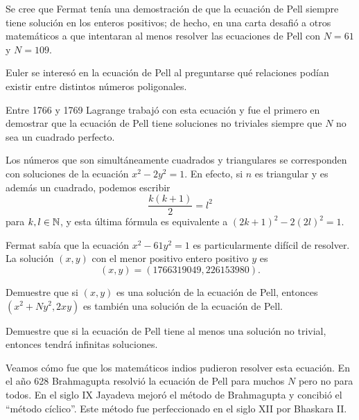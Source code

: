 Se cree que Fermat tenía una demostración de que la ecuación de Pell siempre
tiene solución en los enteros positivos; de hecho, en una carta desafió a otros
matemáticos a que intentaran al menos resolver las ecuaciones de Pell con
$N=61$ y $N=109$.  

Euler se interesó en la ecuación de Pell al preguntarse qué
relaciones podían existir entre distintos números poligonales.  

Entre 1766 y
1769 Lagrange trabajó con esta ecuación y fue el primero en demostrar que la
ecuación de Pell tiene soluciones no triviales siempre que $N$ no sea un
cuadrado perfecto. 

\begin{example}
	Los números que son simultáneamente cuadrados y triangulares se
	corresponden con soluciones de la ecuación $x^2-2y^2=1$. En efecto, si $n$
	es triangular y es además un cuadrado, podemos escribir 
	\[
		\frac{k(k+1)}{2}=l^2
	\]
	para $k,l\in\mathbb{N}$, y esta última fórmula es equivalente a
	$(2k+1)^2-2(2l)^2=1$.
\end{example}


Fermat sabía que la ecuación $x^2-61y^2=1$ es particularmente difícil de
resolver. La solución $(x,y)$ con el menor positivo entero positivo $y$ es
\[
(x,y)=(1766319049, 226153980).
\]

\begin{exercise}
	Demuestre que si $(x,y)$ es una solución de la ecuación de Pell, entonces 
	$(x^2+Ny^2,2xy)$ es también una solución de la ecuación de Pell. 
\end{exercise}

\begin{exercise}
	Demuestre que si la ecuación de Pell tiene al menos una solución no
	trivial, entonces tendrá infinitas soluciones. 
\end{exercise}

Veamos cómo fue que los matemáticos indios pudieron resolver esta ecuación.  En
el año 628 Brahmagupta resolvió la ecuación de Pell para muchos $N$  pero no
para todos. En el siglo IX Jayadeva mejoró el método de Brahmagupta y concibió
el ``método cíclico''. Este método fue perfeccionado en el siglo XII por
Bhaskara II. 

